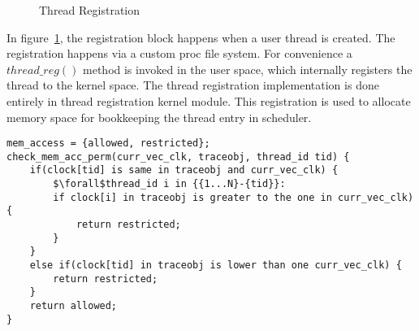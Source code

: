 \begin{figure}[h]
\centering
{}
\caption{Thread Registration}
\label{thread_reg}
\end{figure}
In figure~\ref{thread_reg}, the registration block happens when a user thread is created. 
The registration happens via a custom proc file system. 
For convenience a $thread\_reg()$ method is invoked in the user space, which internally registers the thread to the kernel space. 
The thread registration implementation is done entirely in thread registration kernel module. 
This registration is used to allocate memory space for bookkeeping the thread entry in scheduler. 
\newpage
\begin{lstlisting}[mathescape=true,style=customc,caption={Pseudo Code for checking memory access permission},frame=tlrb,label={lst:check_perm}]
mem_access = {allowed, restricted};
check_mem_acc_perm(curr_vec_clk, traceobj, thread_id tid) {
	if(clock[tid] is same in traceobj and curr_vec_clk) {
		$\forall$thread_id i in {{1...N}-{tid}}:
		if clock[i] in traceobj is greater to the one in curr_vec_clk) {
			return restricted;		
		}	
	}
	else if(clock[tid] in traceobj is lower than one curr_vec_clk) {
		return restricted;	
	}
	return allowed;
}
\end{lstlisting}


